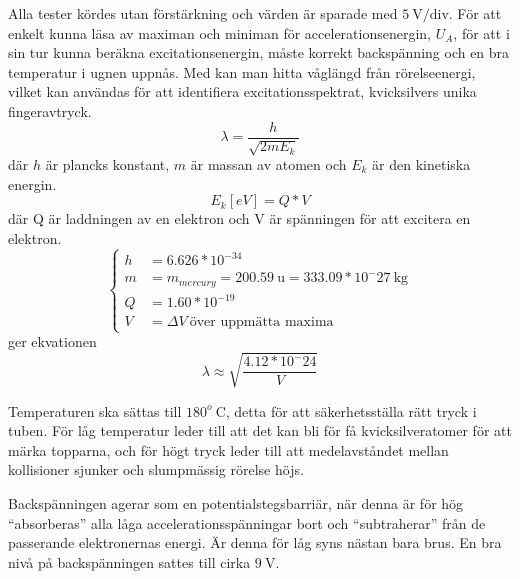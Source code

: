 Alla tester kördes utan förstärkning och värden är sparade med $5~\textrm{V/div.}$
För att enkelt kunna läsa av maximan och miniman för accelerationsenergin, $U_A$, för att i sin tur kunna beräkna excitationsenergin, måste korrekt backspänning och en bra temperatur i ugnen uppnås. Med \cite[s. 303]{ph} kan man hitta våglängd från rörelseenergi, vilket kan användas för att identifiera excitationsspektrat, kvicksilvers unika fingeravtryck.
\begin{equation}\label{eq:debrog}
	\lambda = \frac{h}{\sqrt{2mE_k}}
\end{equation}
där $h$ är plancks konstant, $m$ är massan av atomen och $E_k$ är den kinetiska energin.
\begin{equation}\label{eq:ek}
	E_k [eV]= Q * V 
\end{equation}
där Q är laddningen av en elektron och V är spänningen för att excitera en elektron.
\begin{equation}\label{eq:values}
	\begin{cases}
		h	&= 6.626*10^{-34}\\
		m	&= m_{mercury} = 200.59~\textrm{u} = 333.09*10^-27~\textrm{kg}\\
		Q	&= 1.60*10^{-19}\\
		V	&= \Delta V~\textrm{över uppmätta maxima}
	\end{cases}
\end{equation}
ger ekvationen
\begin{equation}\label{eq:fin}
	\lambda \approx \sqrt{\frac{4.12*10^-24}{V}}
\end{equation}

Temperaturen ska sättas till $180^o~\textrm{C}$, detta för att säkerhetsställa rätt tryck i tuben. För låg temperatur leder till att det kan bli för få kvicksilveratomer för att märka topparna, och för högt tryck leder till att medelavståndet mellan kollisioner sjunker och slumpmässig rörelse höjs\cite{rochhand}.

Backspänningen agerar som en potentialstegsbarriär, när denna är för hög ``absorberas'' alla låga accelerationsspänningar bort och ``subtraherar'' från de passerande elektronernas energi. Är denna för låg syns nästan bara brus.
En bra nivå på backspänningen sattes till cirka $9~\textrm{V}$.